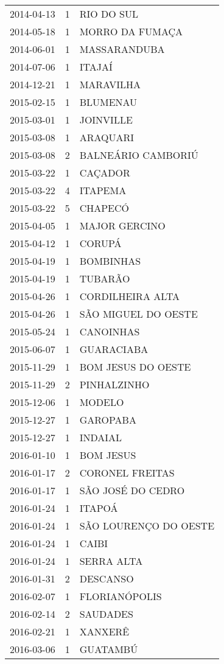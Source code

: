 \begin{longtable}[htbp]{ccl}
2014-04-13 & 1 & RIO DO SUL \\
2014-05-18 & 1 & MORRO DA FUMAÇA \\
2014-06-01 & 1 & MASSARANDUBA \\
2014-07-06 & 1 & ITAJAÍ \\
2014-12-21 & 1 & MARAVILHA \\
2015-02-15 & 1 & BLUMENAU \\
2015-03-01 & 1 & JOINVILLE \\
2015-03-08 & 1 & ARAQUARI \\
2015-03-08 & 2 & BALNEÁRIO CAMBORIÚ \\
2015-03-22 & 1 & CAÇADOR \\
2015-03-22 & 4 & ITAPEMA \\
2015-03-22 & 5 & CHAPECÓ \\
2015-04-05 & 1 & MAJOR GERCINO \\
2015-04-12 & 1 & CORUPÁ \\
2015-04-19 & 1 & BOMBINHAS \\
2015-04-19 & 1 & TUBARÃO \\
2015-04-26 & 1 & CORDILHEIRA ALTA \\
2015-04-26 & 1 & SÃO MIGUEL DO OESTE \\
2015-05-24 & 1 & CANOINHAS \\
2015-06-07 & 1 & GUARACIABA \\
2015-11-29 & 1 & BOM JESUS DO OESTE \\
2015-11-29 & 2 & PINHALZINHO \\
2015-12-06 & 1 & MODELO \\
2015-12-27 & 1 & GAROPABA \\
2015-12-27 & 1 & INDAIAL \\
2016-01-10 & 1 & BOM JESUS \\
2016-01-17 & 2 & CORONEL FREITAS \\
2016-01-17 & 1 & SÃO JOSÉ DO CEDRO \\
2016-01-24 & 1 & ITAPOÁ \\
2016-01-24 & 1 & SÃO LOURENÇO DO OESTE \\
2016-01-24 & 1 & CAIBI \\
2016-01-24 & 1 & SERRA ALTA \\
2016-01-31 & 2 & DESCANSO \\
2016-02-07 & 1 & FLORIANÓPOLIS \\
2016-02-14 & 2 & SAUDADES \\
2016-02-21 & 1 & XANXERÊ \\
2016-03-06 & 1 & GUATAMBÚ \\

\end{longtable}

